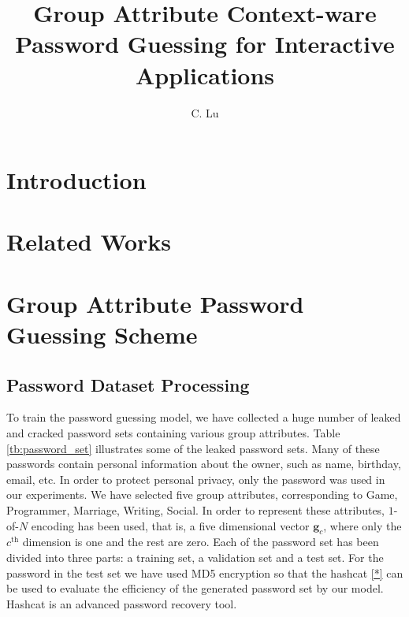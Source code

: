\documentclass[10pt, twocolumnjournal]{IEEEtran}
\title{Group Attribute Context-ware Password Guessing for Interactive Applications}
\author{C. Lu}
\begin{document}
	
\maketitle
	
\begin{abstract}	
\end{abstract}
	
\begin{IEEEkeywords}	
\end{IEEEkeywords}

\section{Introduction}
\label{sec:introduction}

	
\section{Related Works}
\label{sec:related}
\section{Group Attribute Password Guessing Scheme}
\subsection{Password Dataset Processing}
To train the password guessing model, we have collected a huge number of leaked and cracked password sets containing various group attributes. Table \ref{tb:password_set} illustrates some of the leaked password sets. Many of these passwords contain personal information about the owner, such as name, birthday, email, etc. In order to protect personal privacy, only the password was used in our experiments. We have selected five group attributes, corresponding to Game, Programmer, Marriage, Writing, Social. In order to represent these attributes, $1$-of-$N$ encoding has been used, that is, a five dimensional vector $\bm g_c$, where only the $c^{\mathrm{th}}$ dimension is one and the rest are zero. Each of the password set has been divided into three parts: a training set, a validation set and a test set. For the password in the test set we have used MD5 encryption so that the hashcat \ref{*} can be used to evaluate the efficiency of the generated password set by our model. Hashcat is an advanced password recovery tool.
\end{document}

